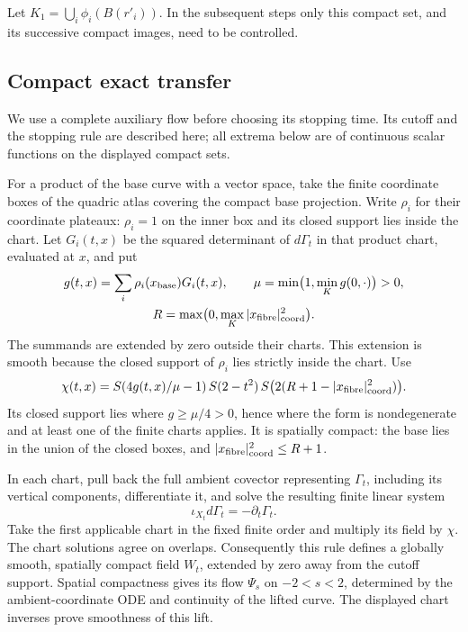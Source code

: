 Let $K_1=\bigcup_i\phi_i(B(r'_i))$. In the subsequent steps only this compact set,
and its successive compact images, need to be controlled.

\subsection{Compact exact transfer}\label{sec:sxr-moser}

We use a complete auxiliary flow before choosing its stopping time. Its cutoff
and the stopping rule are described here; all extrema below are of continuous
scalar functions on the displayed compact sets.

For a product of the base curve with a vector space, take the finite coordinate
boxes of the quadric atlas covering the compact base projection. Write $\rho_i$
for their coordinate plateaux: $\rho_i=1$ on the inner box and its closed support
lies inside the chart. Let $G_i(t,x)$ be the squared determinant of $d\Gamma_t$
in that product chart, evaluated at $x$, and put
\[
 \begin{gathered}
 g(t,x)=\sum_i\rho_i(x_{\rm base})G_i(t,x),\qquad
 \mu=\min\bigl(1,\min_K g(0,\cdot)\bigr)>0,\\
 R=\max\bigl(0,\max_K |x_{\rm fibre}|_{\rm coord}^2\bigr).
 \end{gathered}
\]
The summands are extended by zero outside their charts. This extension is smooth
because the closed support of $\rho_i$ lies strictly inside the chart. Use
\begin{equation}\label{eq:sxr-native-cutoff}
 \chi(t,x)=S(4g(t,x)/\mu-1)\,S(2-t^2)\,
 S\bigl(2(R+1-|x_{\rm fibre}|_{\rm coord}^2)\bigr).
\end{equation}
Its closed support lies where $g\ge\mu/4>0$, hence where the form is
nondegenerate and at least one of the finite charts applies. It is spatially
compact: the base lies in the union of the closed boxes, and
$|x_{\rm fibre}|_{\rm coord}^2\le R+1$.

In each chart, pull back the full ambient covector representing $\Gamma_t$,
including its vertical components, differentiate it, and solve the resulting
finite linear system
\[
 \iota_{X_t}d\Gamma_t=-\partial_t\Gamma_t.
\]
Take the first applicable chart in the fixed finite order and multiply its field
by $\chi$. The chart solutions agree on overlaps. Consequently this rule defines
a globally smooth, spatially compact field $W_t$, extended by zero away from the
cutoff support. Spatial compactness gives its flow $\Psi_s$ on $-2<s<2$,
determined by the ambient-coordinate ODE and continuity of the lifted curve. The displayed
chart inverses prove smoothness of this lift.

